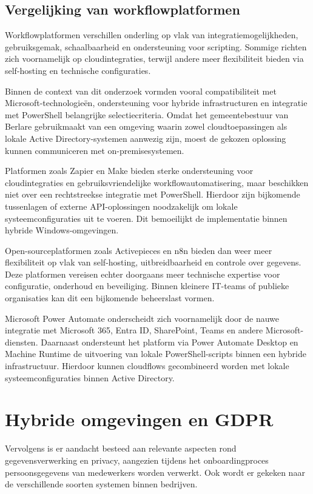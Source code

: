\subsection{Vergelijking van workflowplatformen}

Workflowplatformen verschillen onderling op vlak van integratiemogelijkheden, gebruiksgemak, schaalbaarheid en ondersteuning voor scripting. Sommige richten zich voornamelijk op cloudintegraties, terwijl andere meer flexibiliteit bieden via self-hosting en technische configuraties.

Binnen de context van dit onderzoek vormden vooral compatibiliteit met Microsoft-technologieën, ondersteuning voor hybride infrastructuren en integratie met PowerShell belangrijke selectiecriteria. Omdat het gemeentebestuur van Berlare gebruikmaakt van een omgeving waarin zowel cloudtoepassingen als lokale Active Directory-systemen aanwezig zijn, moest de gekozen oplossing kunnen communiceren met on-premisesystemen.

Platformen zoals Zapier en Make bieden sterke ondersteuning voor cloudintegraties en gebruiksvriendelijke workflowautomatisering, maar beschikken niet over een rechtstreekse integratie met PowerShell. Hierdoor zijn bijkomende tussenlagen of externe API-oplossingen noodzakelijk om lokale systeemconfiguraties uit te voeren. Dit bemoeilijkt de implementatie binnen hybride Windows-omgevingen.

Open-sourceplatformen zoals Activepieces en n8n bieden dan weer meer flexibiliteit op vlak van self-hosting, uitbreidbaarheid en controle over gegevens. Deze platformen vereisen echter doorgaans meer technische expertise voor configuratie, onderhoud en beveiliging. Binnen kleinere IT-teams of publieke organisaties kan dit een bijkomende beheerslast vormen.

Microsoft Power Automate onderscheidt zich voornamelijk door de nauwe integratie met Microsoft 365, Entra ID, SharePoint, Teams en andere Microsoft-diensten. Daarnaast ondersteunt het platform via Power Automate Desktop en Machine Runtime de uitvoering van lokale PowerShell-scripts binnen een hybride infrastructuur. Hierdoor kunnen cloudflows gecombineerd worden met lokale systeemconfiguraties binnen Active Directory.

\section{Hybride omgevingen en GDPR}

Vervolgens is er aandacht besteed aan relevante aspecten rond gegevensverwerking en privacy, aangezien tijdens het onboardingproces persoonsgegevens van medewerkers worden verwerkt. Ook wordt er gekeken naar de verschillende soorten systemen binnen bedrijven.

